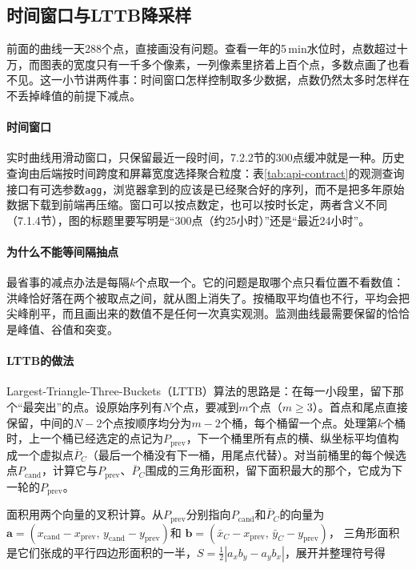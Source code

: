 \subsection{时间窗口与LTTB降采样}

前面的曲线一天288个点，直接画没有问题。查看一年的5\,min水位时，点数超过十万，而图表的宽度只有一千多个像素，一列像素里挤着上百个点，多数点画了也看不见。这一小节讲两件事：时间窗口怎样控制取多少数据，点数仍然太多时怎样在不丢掉峰值的前提下减点。

\paragraph{时间窗口}实时曲线用滑动窗口，只保留最近一段时间，7.2.2节的300点缓冲就是一种。历史查询由后端按时间跨度和屏幕宽度选择聚合粒度：表\ref{tab:api-contract}的观测查询接口有可选参数\texttt{agg}，浏览器拿到的应该是已经聚合好的序列，而不是把多年原始数据下载到前端再压缩。窗口可以按点数定，也可以按时长定，两者含义不同（7.1.4节），图的标题里要写明是“300点（约25小时）”还是“最近24小时”。

\paragraph{为什么不能等间隔抽点}最省事的减点办法是每隔$k$个点取一个。它的问题是取哪个点只看位置不看数值：洪峰恰好落在两个被取点之间，就从图上消失了。按桶取平均值也不行，平均会把尖峰削平，而且画出来的数值不是任何一次真实观测。监测曲线最需要保留的恰恰是峰值、谷值和突变。

\paragraph{LTTB的做法}Largest-Triangle-Three-Buckets（LTTB）算法\cite{steinarsson2013lttb}的思路是：在每一小段里，留下那个“最突出”的点。设原始序列有$N$个点，要减到$m$个点（$m\ge3$）。首点和尾点直接保留，中间的$N-2$个点按顺序均分为$m-2$个桶，每个桶留一个点。处理第$k$个桶时，上一个桶已经选定的点记为$P_{\mathrm{prev}}$，下一个桶里所有点的横、纵坐标平均值构成一个虚拟点$\overline{P}_{C}$（最后一个桶没有下一桶，用尾点代替）。对当前桶里的每个候选点$P_{\mathrm{cand}}$，计算它与$P_{\mathrm{prev}}$、$\overline{P}_{C}$围成的三角形面积，留下面积最大的那个，它成为下一轮的$P_{\mathrm{prev}}$。

面积用两个向量的叉积计算。从$P_{\mathrm{prev}}$分别指向$P_{\mathrm{cand}}$和$\overline{P}_{C}$的向量为
$\boldsymbol a=(x_{\mathrm{cand}}-x_{\mathrm{prev}},\,y_{\mathrm{cand}}-y_{\mathrm{prev}})$和
$\boldsymbol b=(\bar{x}_{C}-x_{\mathrm{prev}},\,\bar{y}_{C}-y_{\mathrm{prev}})$，
三角形面积是它们张成的平行四边形面积的一半，$S=\frac12|a_xb_y-a_yb_x|$，展开并整理符号得

